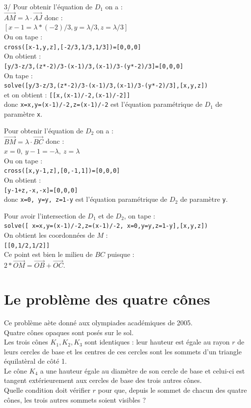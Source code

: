 \documentclass[a4paper,11pt]{book}
\begin{document}
3/ Pour obtenir l'\'equation de $D_1$ on a :\\
$\overrightarrow{AM}=\lambda \cdot\overrightarrow{AJ}$ donc :\\
$[x-1=\lambda*(-2)/3,y=\lambda/3,z=\lambda/3]$\\
Ou on tape :\\
{\tt cross([x-1,y,z],[-2/3,1/3,1/3])=[0,0,0]}\\
On obtient :\\
{\tt [y/3-z/3,(z*-2)/3-(x-1)/3,(x-1)/3-(y*-2)/3]=[0,0,0]}\\
On tape :\\
{\tt solve([y/3-z/3,(z*-2)/3-(x-1)/3,(x-1)/3-(y*-2)/3],[x,y,z])}\\
et on obtient : {\tt [[x,(x-1)/-2,(x-1)/-2]]}\\
donc {\tt x=x,y=(x-1)/-2,z=(x-1)/-2} est l'\'equation param\'etrique de $D_1$ 
de param\`etre {\tt x}.

Pour obtenir l'\'equation de $D_2$ on a :\\
$\overrightarrow{BM}=\lambda \cdot\overrightarrow{BC}$ donc :\\
$x=0,\ y-1=-\lambda,\ z=\lambda$\\
Ou on tape :\\
{\tt cross([x,y-1,z],[0,-1,1])=[0,0,0]}\\
On obtient :\\
{\tt [y-1+z,-x,-x]=[0,0,0]}\\
donc {\tt x=0, y=y, z=1-y} est l'\'equation param\'etrique de $D_2$ de 
param\`etre {\tt y}.

Pour avoir l'intersection de $D_1$ et de $D_2$, on tape :\\
{\tt solve([ x=x,y=(x-1)/-2,z=(x-1)/-2, x=0,y=y,z=1-y],[x,y,z])}\\
On obtient les coordonn\'ees de $M$ :\\
{\tt [[0,1/2,1/2]]}\\
Ce point est bien le milieu de $BC$ puisque :\\
$2*\overrightarrow{OM}=\overrightarrow{OB}+\overrightarrow{OC}$.


\section{Le probl\`eme des quatre c\^ones}
Ce probl\`eme a\`ete donn\'e aux olympiades acad\'emiques de 2005.\\
Quatre c\^ones opaques sont pos\'es sur le sol.\\
Les trois c\^ones $K_1,K_2,K_3$ sont identiques : leur hauteur est \'egale au 
rayon $r$ de leurs cercles de base et les centres de ces cercles sont les 
sommets d'un triangle \'equilat\`eral de c\^ot\'e 1.\\
Le c\^one $K_4$ a une hauteur \'egale au diam\`etre de son cercle de base et 
celui-ci est tangent ext\'erieurement aux cercles de base des trois autres 
c\^ones.\\
Quelle condition doit v\'erifier $r$ pour que, depuis le sommet de chacun des 
quatre c\^ones, les trois autres sommets soient visibles ?
\end{document}
